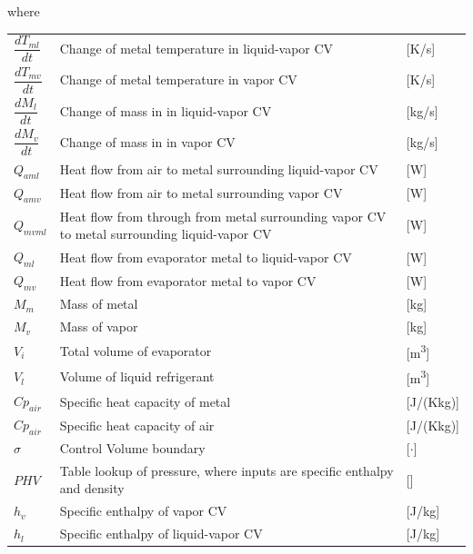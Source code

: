 where\\


\begin{center}
	\begin{tabular}{l p{10cm} l}
		$\dfrac{d T_{ml}}{dt} $		& Change of metal temperature in liquid-vapor CV  			& [\si{K}/\si{s}] \\[0.3cm]		
		$\dfrac{d T_{mv}}{dt} $		& Change of metal temperature in vapor CV					& [\si{K}/\si{s}] \\[0.3cm]		
		$\dfrac{d M_{l}}{dt} $		& Change of mass in	in liquid-vapor CV 						& [\si{kg}/\si{s}] \\[0.3cm]		
		$\dfrac{d M_{v}}{dt} $		& Change of mass in	in vapor CV								& [\si{kg}/\si{s}] \\[0.3cm]		
		$Q_{aml}$					& Heat flow from air to metal surrounding liquid-vapor CV	& [\si{W}] \\	
		$Q_{amv}$					& Heat flow from air to metal surrounding vapor CV			& [\si{W}] \\		
		$Q_{mvml}$					& Heat flow from through from metal surrounding vapor CV to metal surrounding liquid-vapor CV			& [\si{W}] \\	
		$Q_{ml}$					& Heat flow from evaporator metal to liquid-vapor CV		& [\si{W}] \\	
		$Q_{mv}$					& Heat flow from evaporator metal to vapor CV				& [\si{W}] \\				
		$M_{m} $					& Mass of metal												& [\si{kg}] \\	
		$M_{v} $					& Mass of vapor												& [\si{kg}] \\	
		$V_{i} $					& Total volume of evaporator								& [\si{m^3}] \\	
		$V_{l} $					& Volume of liquid refrigerant								& [\si{m^3}] \\	
		$Cp_{air}$					& Specific heat capacity of metal							& [\si{J}/(\si{K}\si{kg})] \\	
		$Cp_{air}$					& Specific heat capacity of air								& [\si{J}/(\si{K}\si{kg})] \\	
		$\sigma$					& Control Volume boundary 									& [$\cdot$] \\		
		$PHV $						& Table lookup of pressure, where inputs are specific enthalpy and density								& [] \\	
		$h_{v} $					& Specific enthalpy of vapor CV								& [\si{J}/\si{kg}] \\	
		$h_{l} $					& Specific enthalpy of liquid-vapor CV						& [\si{J}/\si{kg}] \\	

\end{tabular}
\end{center}

